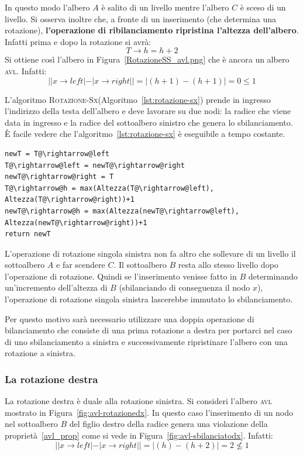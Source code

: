 In questo modo l'albero $A$ è salito di un livello mentre l'albero $C$ è sceso di un livello. Si osserva inoltre che, a fronte di un inserimento (che determina una rotazione), \textbf{l'operazione di ribilanciamento ripristina l'altezza dell'albero}. Infatti prima e dopo la rotazione si avrà: \[T \rightarrow h = h+2\] Si ottiene così l'albero in Figura~\ref{RotazioneSS_avl.png} che è ancora un albero \textsc{avl}. Infatti:
\begin{displaymath}
| |x \rightarrow left| - |x \rightarrow right||=|(h+1) - (h+1) |= 0 \leq 1
\end{displaymath}

L'algoritmo \textsc{Rotazione-Sx}(Algoritmo~\ref{lst:rotazione-sx}) prende in ingresso l'indirizzo della testa dell'albero e deve lavorare su due nodi: la radice che viene data in ingresso e la radice del sottoalbero sinistro che genera lo sbilanciamento. È facile vedere che l'algoritmo~\ref{lst:rotazione-sx} è eseguibile a tempo costante.

\begin{lstlisting}[language=asd,caption={Rotazione-Sx(T)},label=lst:rotazione-sx]
newT = T@\rightarrow@left
T@\rightarrow@left = newT@\rightarrow@right
newT@\rightarrow@right = T
T@\rightarrow@h = max(Altezza(T@\rightarrow@left), Altezza(T@\rightarrow@right))+1
newT@\rightarrow@h = max(Altezza(newT@\rightarrow@left), Altezza(newT@\rightarrow@right))+1
return newT
\end{lstlisting}

L'operazione di rotazione singola sinistra non fa altro che sollevare di un livello il sottoalbero $A$ e far scendere $C$. Il sottoalbero $B$ resta allo stesso livello dopo l'operazione di rotazione. Quindi se l'inserimento venisse fatto in $B$ determinando un'incremento dell'altezza di $B$ (sbilanciando di conseguenza il nodo $x$), l'operazione di rotazione singola sinistra lascerebbe immutato lo sbilanciamento.

Per questo motivo sarà necessario utilizzare una doppia operazione di bilanciamento che consiste di una prima rotazione a destra per portarci nel caso di uno sbilanciamento a sinistra e successivamente ripristinare l'albero con una rotazione a sinistra.

\subsubsection{La rotazione destra}
La rotazione destra è duale alla rotazione sinistra. Si consideri l'albero \textsc{avl} mostrato in Figura~\ref{fig:avl-rotazionedx}. In questo caso l'inserimento di un nodo nel sottoalbero $B$ del figlio destro della radice genera una violazione della proprietà~\ref{avl_prop} come si vede in Figura~\ref{fig:avl-sbilanciatodx}. Infatti:
\begin{displaymath}
| |x \rightarrow left| - |x \rightarrow right||=|(h) - (h+2) |=2 \nleq 1
\end{displaymath}

